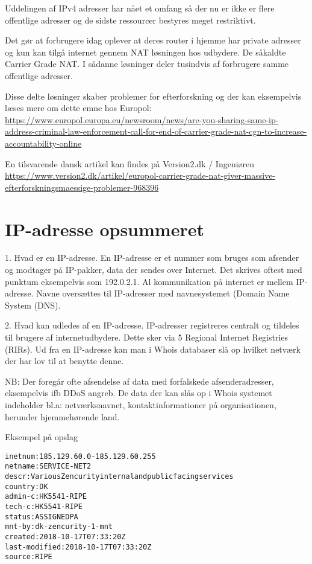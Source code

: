 \documentclass[a4paper,11pt,notitlepage]{report}
\begin{document}
Uddelingen af IPv4 adresser har nået et omfang så der nu er ikke er flere offentlige adresser og de sidste ressourcer bestyres meget restriktivt.

Det gør at forbrugere idag oplever at deres router i hjemme har private adresser og kun kan tilgå internet gennem NAT løsningen hos udbydere. De såkaldte Carrier Grade NAT. I sådanne løsninger deler tusindvis af forbrugere samme offentlige adresser.

Disse delte løsninger skaber problemer for efterforskning og der kan eksempelvis læses mere om dette emne hos Europol:\\
{\footnotesize\url{https://www.europol.europa.eu/newsroom/news/are-you-sharing-same-ip-address-criminal-law-enforcement-call-for-end-of-carrier-grade-nat-cgn-to-increase-accountability-online}}

En tilsvarende dansk artikel kan findes på Version2.dk / Ingeniøren\\
{\footnotesize\url{https://www.version2.dk/artikel/europol-carrier-grade-nat-giver-massive-efterforskningsmaessige-problemer-968396}}

\chapter{IP-adresse opsummeret}

1.  Hvad er en IP-adresse. En IP-adresse er et nummer som bruges som afsender og modtager på IP-pakker, data der sendes over Internet. Det skrives oftest med punktum eksempelvis som 192.0.2.1. Al kommunikation på internet er mellem IP-adresse. Navne oversættes til IP-adresser med navnesystemet (Domain Name System (DNS).


2.  Hvad kan udledes af en IP-adresse. IP-adresser registreres centralt og tildeles til brugere af internetudbydere. Dette sker via 5 Regional Internet Registries (RIRs). Ud fra en IP-adresse kan man i Whois databaser slå op hvilket netværk der har lov til at benytte denne.

NB: Der foregår ofte afsendelse af data med forfalskede afsenderadresser, eksempelvis ifb DDoS angreb.
  De data der kan slås op i Whois systemet indeholder bl.a: netværksnavnet, kontaktinformationer på organisationen, herunder hjemmehørende land.

Eksempel på opslag
\begin{alltt}
inetnum:        185.129.60.0 - 185.129.60.255
netname:        SERVICE-NET2
descr:          Various Zencurity internal and public facing services
country:        DK
admin-c:        HK5541-RIPE
tech-c:         HK5541-RIPE
status:         ASSIGNED PA
mnt-by:         dk-zencurity-1-mnt
created:        2018-10-17T07:33:20Z
last-modified:  2018-10-17T07:33:20Z
source:         RIPE
\end{alltt}
\end{document}
